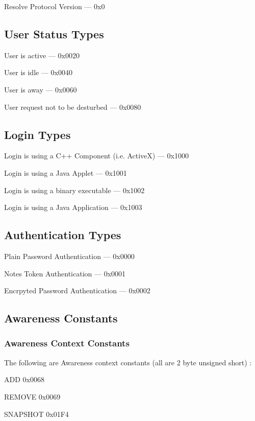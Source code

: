 \documentclass[titlepage,oneside]{book}
\begin{document}
Resolve Protocol Version                          --- 0x0

\subsection{User Status Types}

User is active                                    --- 0x0020

User is idle                                      --- 0x0040

User is away                                      --- 0x0060

User request not to be desturbed                  --- 0x0080

\subsection{Login Types}

Login is using a C++ Component (i.e. ActiveX)     --- 0x1000

Login is using a Java Applet                      --- 0x1001

Login is using a binary executable                --- 0x1002

Login is using a Java Application                 --- 0x1003

\subsection{Authentication Types}

Plain Password Authentication                     --- 0x0000

Notes Token Authentication                        --- 0x0001

Encrpyted Password Authentication                 --- 0x0002

\subsection{Awareness Constants}
\subsubsection{Awareness Context Constants}

The following are Awareness context constants (all are 2 byte unsigned
short) :

ADD        0x0068

REMOVE     0x0069

SNAPSHOT   0x01F4
\end{document}
